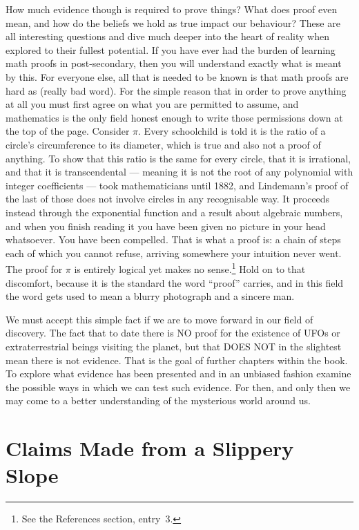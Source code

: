 How much evidence though is required to prove things? What does proof even mean,
and how do the beliefs we hold as true impact our behaviour? These are all
interesting questions and dive much deeper into the heart of reality when explored
to their fullest potential. If you have ever had the burden of learning math
proofs in post-secondary, then you will understand exactly what is meant by this.
For everyone else, all that is needed to be known is that math proofs are hard as
(really bad word). For the simple reason that in order to prove anything at all you must first agree
on what you are permitted to assume, and mathematics is the only field honest enough to write those
permissions down at the top of the page. Consider $\pi$. Every schoolchild is told it is the ratio
of a circle's circumference to its diameter, which is true and also not a proof of anything. To show
that this ratio is the same for every circle, that it is irrational, and that it is transcendental
--- meaning it is not the root of any polynomial with integer coefficients --- took mathematicians
until 1882, and Lindemann's proof of the last of those does not involve circles in any recognisable
way. It proceeds instead through the exponential function and a result about algebraic numbers, and
when you finish reading it you have been given no picture in your head whatsoever. You have been
compelled. That is what a proof is: a chain of steps each of which you cannot refuse, arriving
somewhere your intuition never went. The proof for $\pi$ is
entirely logical yet makes no sense.\footnote{See the References section,
entry~3.} Hold on to that discomfort, because it is the standard the word ``proof'' carries, and in
this field the word gets used to mean a blurry photograph and a sincere man.

We must accept this simple fact if we are to move forward in our field of
discovery. The fact that to date there is NO proof for the existence of UFOs or
extraterrestrial beings visiting the planet, but that DOES NOT in the slightest
mean there is not evidence. That is the goal of further chapters within the book.
To explore what evidence has been presented and in an unbiased fashion examine the
possible ways in which we can test such evidence. For then, and only then we may
come to a better understanding of the mysterious world around us.

\section{Claims Made from a Slippery Slope}\label{sec:claimsmadeslipperyslope}

